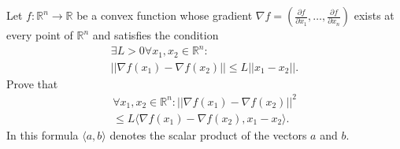 \documentclass{article}
\begin{document}
\setlength{\parindent}{0pt}
Let $f:\mathbb{R}^{n}\to\mathbb{R}$ be a convex function whose gradient $\nabla f=\left(\frac{\partial f}{\partial x_{1}},\dots,\frac{\partial f}{\partial x_{n}}\right)$ exists at every point of $\mathbb{R}^{n}$ and satisfies the condition
\begin{multline*}
\exists L>0\forall x_{1},x_{2}\in\mathbb{R}^{n}:\\||\nabla f(x_{1})-\nabla f(x_{2})||\le L||x_{1}-x_{2}||.
\end{multline*}
Prove that
\begin{multline*}
\forall x_{1},x_{2}\in\mathbb{R}^{n}:||\nabla f(x_{1})-\nabla f(x_{2})||^{2}\\\le L\langle\nabla f(x_{1})-\nabla f(x_{2}),x_{1}-x_{2}\rangle.
\end{multline*}In this formula $\langle a,b\rangle$ denotes the scalar product of the vectors $a$ and $b$.
\end{document}
